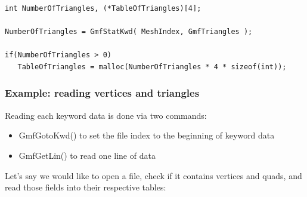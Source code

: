 \documentclass[a4paper,12pt]{article}
\begin{document}
\begin{tt}
\begin{verbatim}
int NumberOfTriangles, (*TableOfTriangles)[4];

NumberOfTriangles = GmfStatKwd( MeshIndex, GmfTriangles );

if(NumberOfTriangles > 0)
   TableOfTriangles = malloc(NumberOfTriangles * 4 * sizeof(int));
\end{verbatim}
\end{tt}
\normalfont


\subsubsection{Example: reading vertices and triangles}

Reading each keyword data is done via two commands:

\begin{itemize}
\item GmfGotoKwd() to set the file index to the beginning of keyword data
\item GmfGetLin() to read one line of data
\end{itemize}

Let's say we would like to open a file, check if it contains vertices and quads, and read those fields into their respective tables:
\end{document}
